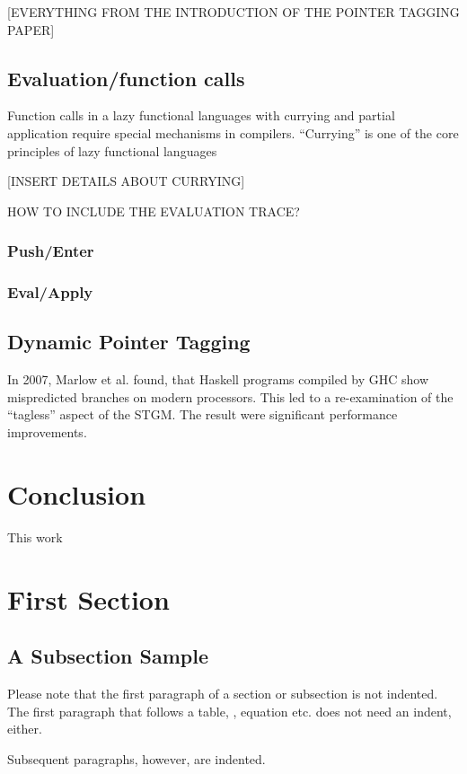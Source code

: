 \documentclass[runningheads]{llncs}
\begin{document}
[EVERYTHING FROM THE INTRODUCTION OF THE POINTER TAGGING PAPER]


\subsection{Evaluation/function calls}
Function calls in a lazy functional languages with currying and partial application require special mechanisms in compilers.
\enquote{Currying} is one of the core principles of lazy functional languages 

[INSERT DETAILS ABOUT CURRYING]


HOW TO INCLUDE THE EVALUATION TRACE?



\subsubsection{Push/Enter}
\subsubsection{Eval/Apply}

\subsection{Dynamic Pointer Tagging}
In 2007, Marlow et al.\cite{marlow2007faster} found, that Haskell programs compiled by GHC show mispredicted branches on modern processors. This led to a re-examination of the \enquote{tagless} aspect of the STGM. The result were significant performance improvements.


\section{Conclusion}
\label{sec:conclusion}

This work 


\section{First Section}
\subsection{A Subsection Sample}
Please note that the first paragraph of a section or subsection is
not indented. The first paragraph that follows a table, ,
equation etc. does not need an indent, either.

Subsequent paragraphs, however, are indented.
\end{document}
